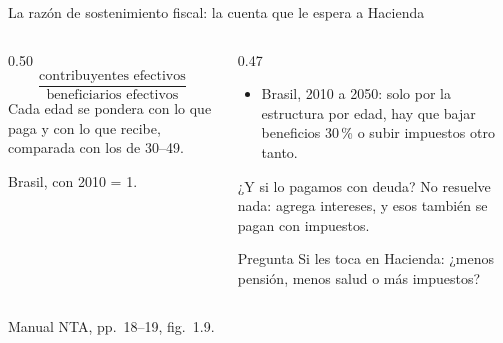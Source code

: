 \documentclass[aspectratio=169,11pt]{beamer}
\newcommand{\fuente}[1]{\par\vfill{\small\color{cGris}#1\par}}
\begin{document}
\begin{frame}{La razón de sostenimiento fiscal: la cuenta que le espera a Hacienda}
  \begin{columns}[T]
    \begin{column}{0.50\textwidth}
      \[
        \frac{\text{contribuyentes efectivos}}{\text{beneficiarios efectivos}}
      \]
      Cada edad se pondera con lo que paga y con lo que recibe, comparada con los de 30--49.
      \par\medskip
      \centering
      \par{\small\color{cGris}Brasil, con 2010 = 1.}
    \end{column}
    \begin{column}{0.47\textwidth}
      \begin{itemize}
        \item Brasil, 2010 a 2050: solo por la estructura por edad, hay que bajar beneficios 30\,\% o subir impuestos otro tanto.
      \end{itemize}
      \pause
      \begin{block}{¿Y si lo pagamos con deuda?}
        No resuelve nada: agrega intereses, y esos también se pagan con impuestos.
      \end{block}
      \pause
      \begin{alertblock}{Pregunta}
        Si les toca en Hacienda: ¿menos pensión, menos salud o más impuestos?
      \end{alertblock}
    \end{column}
  \end{columns}
  \fuente{Manual NTA, pp.~18--19, fig.~1.9.}
\end{frame}

\end{document}

